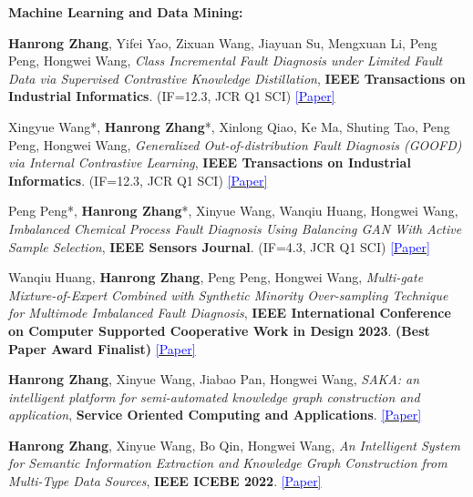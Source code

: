\documentclass[letterpaper,11pt]{article}
\begin{document}
\noindent\textbf{Machine Learning and Data Mining:}
\begin{enumerate}[itemsep=1pt, topsep=1pt, parsep=1pt, leftmargin=*, label={[\arabic*]}]
    \item \small{\textbf{Hanrong Zhang}, Yifei Yao, Zixuan Wang, Jiayuan Su, Mengxuan Li, Peng Peng, Hongwei Wang, \textit{Class Incremental Fault Diagnosis under Limited Fault Data via Supervised Contrastive Knowledge Distillation}, \textbf{IEEE Transactions on Industrial Informatics}. (IF=12.3, JCR Q1 SCI) \href{https://arxiv.org/pdf/2501.09525}{\textcolor{blue}{[Paper]}}}
    \item \small{Xingyue Wang*, \textbf{Hanrong Zhang}*, Xinlong Qiao, Ke Ma, Shuting Tao, Peng Peng, Hongwei Wang, \textit{Generalized Out-of-distribution Fault Diagnosis (GOOFD) via Internal Contrastive Learning}, \textbf{IEEE Transactions on Industrial Informatics}. (IF=12.3, JCR Q1 SCI) \href{https://ieeexplore.ieee.org/abstract/document/10510599}{\textcolor{blue}{[Paper]}}}
    \item \small{Peng Peng*, \textbf{Hanrong Zhang}*, Xinyue Wang, Wanqiu Huang, Hongwei Wang, \textit{Imbalanced Chemical Process Fault Diagnosis Using Balancing GAN With Active Sample Selection}, \textbf{IEEE Sensors Journal}. (IF=4.3, JCR Q1 SCI) \href{https://ieeexplore.ieee.org/abstract/document/10114639}{\textcolor{blue}{[Paper]}}}
    \item \small{Wanqiu Huang, \textbf{Hanrong Zhang}, Peng Peng, Hongwei Wang, \textit{Multi-gate Mixture-of-Expert Combined with Synthetic Minority Over-sampling Technique for Multimode Imbalanced Fault Diagnosis}, \textbf{IEEE International Conference on Computer Supported Cooperative Work in Design 2023}. \textbf{(Best Paper Award Finalist)} \href{https://ieeexplore.ieee.org/abstract/document/10152774}{\textcolor{blue}{[Paper]}}}
    \item \small{\textbf{Hanrong Zhang}, Xinyue Wang, Jiabao Pan, Hongwei Wang, \textit{SAKA: an intelligent platform for semi-automated knowledge graph construction and application}, \textbf{Service Oriented Computing and Applications}. \href{https://link.springer.com/article/10.1007/s11761-023-00371-x}{\textcolor{blue}{[Paper]}}}
    \item \small{\textbf{Hanrong Zhang}, Xinyue Wang, Bo Qin, Hongwei Wang, \textit{An Intelligent System for Semantic Information Extraction and Knowledge Graph Construction from Multi-Type Data Sources}, \textbf{IEEE ICEBE 2022}. \href{https://ieeexplore.ieee.org/abstract/document/10035077}{\textcolor{blue}{[Paper]}}}
\end{enumerate}
\end{document}

